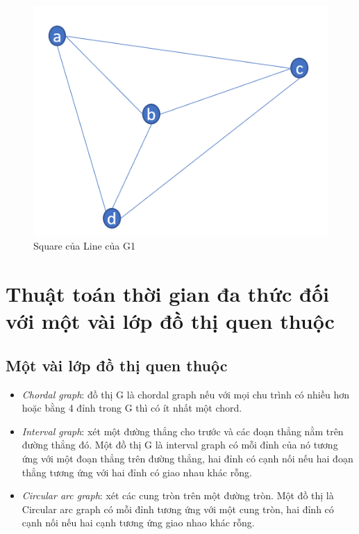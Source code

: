 \documentclass[14pt,a4paper]{extreport}
\begin{document}
\begin{figure}
	\centering
	\includegraphics[scale=.5]{squarelineg}
	\caption{Square của Line của G1}
\end{figure}

\chapter{Thuật toán thời gian đa thức đối với một vài lớp đồ thị quen thuộc}
\section{Một vài lớp đồ thị quen thuộc}

\begin{itemize}
	\item \textit{Chordal graph}: đồ thị G là chordal graph  nếu với mọi chu trình có nhiều hơn hoặc bằng 4 đỉnh trong G thì có ít nhất một chord. 
	\item \textit{Interval graph}: xét một đường thẳng cho trước và các đoạn thẳng nằm trên đường thẳng đó. Một đồ thị G là interval graph có mỗi đỉnh của nó tương ứng với một đoạn thẳng trên đường thẳng, hai đỉnh có cạnh nối nếu hai đoạn thẳng tương ứng với hai đỉnh có giao nhau khác rỗng. 
	\item \textit{Circular arc graph}: xét các cung tròn trên một đường tròn. Một đồ thị là Circular arc graph có mỗi đỉnh tương ứng với một cung tròn, hai đỉnh có cạnh nối nếu hai cạnh tương ứng giao nhao khác rỗng.
\end{itemize}
\end{document}
